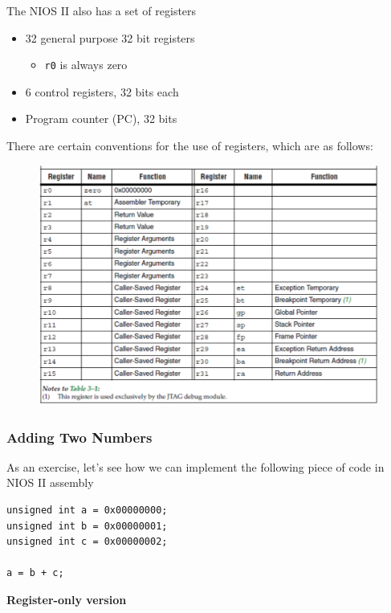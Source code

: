 \documentclass[../notes.tex]{subfiles}
\begin{document}
The NIOS II also has a set of registers

\begin{itemize}
	\item 32 general purpose 32 bit registers
		\begin{itemize}
			\item \texttt{r0} is always zero
		\end{itemize}
	\item 6 control registers, 32 bits each
	\item Program counter (PC), 32 bits
\end{itemize}

There are certain conventions for the use of registers, which are as follows:
\begin{figure}[H]
	\centering
	\includegraphics[width=0.8\linewidth]{img/image_2022-09-16-17-17-34.png}
\end{figure}

\subsubsection{Adding Two Numbers}
As an exercise, let's see how we can implement the following piece of code in NIOS II assembly

\begin{listing}[H]
\begin{verbatim}
unsigned int a = 0x00000000;
unsigned int b = 0x00000001;
unsigned int c = 0x00000002;

a = b + c;
\end{verbatim}
\end{listing}


\textbf{Register-only version} 
\end{document}
